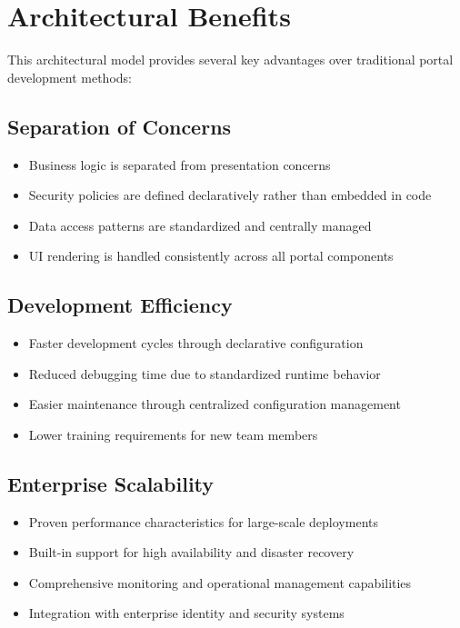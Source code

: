 \section{Architectural Benefits}
\label{sec:architectural-benefits}

This architectural model provides several key advantages over traditional portal development methods:

\subsection{Separation of Concerns}

\begin{itemize}
	\item Business logic is separated from presentation concerns
	\item Security policies are defined declaratively rather than embedded in code
	\item Data access patterns are standardized and centrally managed
	\item UI rendering is handled consistently across all portal components
\end{itemize}

\subsection{Development Efficiency}

\begin{itemize}
	\item Faster development cycles through declarative configuration
	\item Reduced debugging time due to standardized runtime behavior
	\item Easier maintenance through centralized configuration management
	\item Lower training requirements for new team members
\end{itemize}

\subsection{Enterprise Scalability}

\begin{itemize}
	\item Proven performance characteristics for large-scale deployments
	\item Built-in support for high availability and disaster recovery
	\item Comprehensive monitoring and operational management capabilities
	\item Integration with enterprise identity and security systems
\end{itemize}

